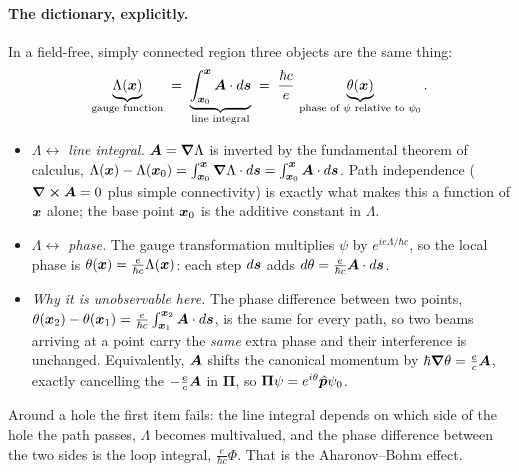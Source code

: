 \paragraph{The dictionary, explicitly.} In a field-free, simply connected region three objects are the same thing:
\[
    \underbrace{\Lambda(\lvect{x})}_{\text{gauge function}}
    \;=\;
    \underbrace{\int_{\lvect{x}_0}^{\lvect{x}}\vect{A}\cdot d\lvect{s}}_{\text{line integral}}
    \;=\;
    \frac{\hbar c}{e}\,\underbrace{\theta(\lvect{x})}_{\text{phase of }\psi\text{ relative to }\psi_0}.
\]
\begin{itemize}
    \item \emph{$\Lambda\leftrightarrow$ line integral.} $\vect{A} = \grad\Lambda$ is inverted by the fundamental theorem of calculus, $\Lambda(\lvect{x}) - \Lambda(\lvect{x}_0) = \int_{\lvect{x}_0}^{\lvect{x}}\grad\Lambda\cdot d\lvect{s} = \int_{\lvect{x}_0}^{\lvect{x}}\vect{A}\cdot d\lvect{s}$. Path independence ($\curl\vect{A} = 0$ plus simple connectivity) is exactly what makes this a function of $\bm{x}$ alone; the base point $\bm{x}_0$ is the additive constant in $\Lambda$.
    \item \emph{$\Lambda\leftrightarrow$ phase.} The gauge transformation multiplies $\psi$ by $e^{ie\Lambda/\hbar c}$, so the local phase is $\theta(\bm{x}) = \frac{e}{\hbar c}\Lambda(\bm{x})$: each step $d\bm{s}$ adds $d\theta = \frac{e}{\hbar c}\vect{A}\cdot d\lvect{s}$.
    \item \emph{Why it is unobservable here.} The phase difference between two points, $\theta(\lvect{x}_2) - \theta(\lvect{x}_1) = \frac{e}{\hbar c}\int_{\lvect{x}_1}^{\lvect{x}_2}\vect{A}\cdot d\lvect{s}$, is the same for every path, so two beams arriving at a point carry the \emph{same} extra phase and their interference is unchanged. Equivalently, $\vect{A}$ shifts the canonical momentum by $\hbar\grad\theta = \frac ec\vect{A}$, exactly cancelling the $-\frac ec\vect{A}$ in $\bm{\Pi}$, so $\bm{\Pi}\psi = e^{i\theta}\hat{\bm{p}}\psi_0$.
\end{itemize}
Around a hole the first item fails: the line integral depends on which side of the hole the path passes, $\Lambda$ becomes multivalued, and the phase difference between the two sides is the loop integral, $\frac{e}{\hbar c}\Phi$. That is the Aharonov--Bohm effect.


